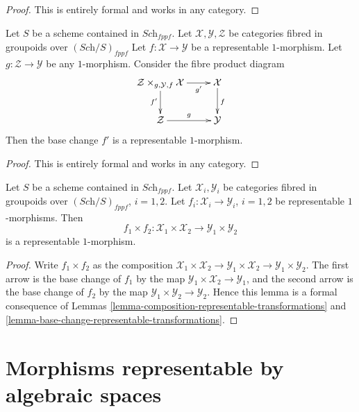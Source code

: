 \begin{proof}
This is entirely formal and works in any category.
\end{proof}

\begin{lemma}
\label{lemma-base-change-representable-transformations}
Let $S$ be a scheme contained in $\textit{Sch}_{fppf}$.
Let $\mathcal{X}, \mathcal{Y}, \mathcal{Z}$
be categories fibred in groupoids over $(\textit{Sch}/S)_{fppf}$
Let $f : \mathcal{X} \to \mathcal{Y}$ be a representable $1$-morphism.
Let $g : \mathcal{Z} \to \mathcal{Y}$ be any $1$-morphism.
Consider the fibre product diagram
$$
\xymatrix{
\mathcal{Z} \times_{g, \mathcal{Y}, f} \mathcal{X} \ar[r]_-{g'} \ar[d]_{f'} &
\mathcal{X} \ar[d]^f \\
\mathcal{Z} \ar[r]^g & \mathcal{Y}
}
$$
Then the base change $f'$ is a representable $1$-morphism.
\end{lemma}

\begin{proof}
This is entirely formal and works in any category.
\end{proof}

\begin{lemma}
\label{lemma-product-representable-transformations}
Let $S$ be a scheme contained in $\textit{Sch}_{fppf}$.
Let $\mathcal{X}_i, \mathcal{Y}_i$ be categories fibred in groupoids over
$(\textit{Sch}/S)_{fppf}$, $i = 1, 2$.
Let $f_i : \mathcal{X}_i \to \mathcal{Y}_i$, $i = 1, 2$
be representable $1$-morphisms.
Then
$$
f_1 \times f_2 :
\mathcal{X}_1 \times \mathcal{X}_2
\longrightarrow
\mathcal{Y}_1 \times \mathcal{Y}_2
$$
is a representable $1$-morphism.
\end{lemma}

\begin{proof}
Write $f_1 \times f_2$ as the composition
$\mathcal{X}_1 \times \mathcal{X}_2 \to
\mathcal{Y}_1 \times \mathcal{X}_2 \to
\mathcal{Y}_1 \times \mathcal{Y}_2$.
The first arrow is the base change of $f_1$ by the map
$\mathcal{Y}_1 \times \mathcal{X}_2 \to \mathcal{Y}_1$, and the second arrow
is the base change of $f_2$ by the map
$\mathcal{Y}_1 \times \mathcal{Y}_2 \to \mathcal{Y}_2$.
Hence this lemma is a formal
consequence of Lemmas \ref{lemma-composition-representable-transformations}
and \ref{lemma-base-change-representable-transformations}.
\end{proof}






\section{Morphisms representable by algebraic spaces}
\label{section-representable-by-algebraic-spaces}

